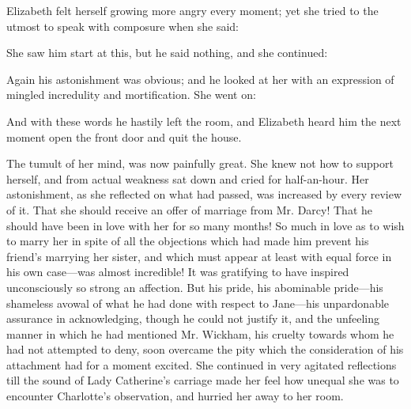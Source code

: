 Elizabeth felt herself growing more angry every moment; yet she tried to the utmost to speak with composure when she said:


She saw him start at this, but he said nothing, and she continued:


Again his astonishment was obvious; and he looked at her with an expression of mingled incredulity and mortification. She went on:



And with these words he hastily left the room, and Elizabeth heard him the next moment open the front door and quit the house.

The tumult of her mind, was now painfully great. She knew not how to support herself, and from actual weakness sat down and cried for half-an-hour. Her astonishment, as she reflected on what had passed, was increased by every review of it. That she should receive an offer of marriage from Mr. Darcy! That he should have been in love with her for so many months! So much in love as to wish to marry her in spite of all the objections which had made him prevent his friend's marrying her sister, and which must appear at least with equal force in his own case---was almost incredible! It was gratifying to have inspired unconsciously so strong an affection. But his pride, his abominable pride---his shameless avowal of what he had done with respect to Jane---his unpardonable assurance in acknowledging, though he could not justify it, and the unfeeling manner in which he had mentioned Mr. Wickham, his cruelty towards whom he had not attempted to deny, soon overcame the pity which the consideration of his attachment had for a moment excited. She continued in very agitated reflections till the sound of Lady Catherine's carriage made her feel how unequal she was to encounter Charlotte's observation, and hurried her away to her room.

